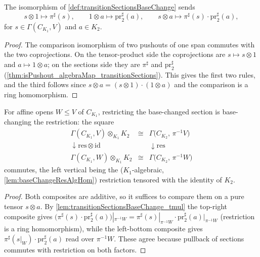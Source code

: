 \begin{lemma}
  \label{lem:transitionSectionsBaseChange_tmul}
  \leanok
  The isomorphism of \ref{def:transitionSectionsBaseChange} sends
  \[
    s \otimes 1 \longmapsto \pi^{\sharp}(s), \qquad
    1 \otimes a \longmapsto \mathrm{pr}_2^{\sharp}(a), \qquad
    s \otimes a \longmapsto \pi^{\sharp}(s) \cdot \mathrm{pr}_2^{\sharp}(a),
  \]
  for \(s \in \Gamma(C_{K_1}, V)\) and \(a \in K_2\).
\end{lemma}
\begin{proof}
  \leanok
  The comparison isomorphism of two pushouts of one span commutes with the two
  coprojections. On the tensor-product side the coprojections are \(s \mapsto s \otimes
  1\) and \(a \mapsto 1 \otimes a\); on the sections side they are \(\pi^{\sharp}\) and
  \(\mathrm{pr}_2^{\sharp}\) (\ref{thm:isPushout_algebraMap_transitionSections}). This
  gives the first two rules, and the third follows since \(s \otimes a = (s \otimes 1)
  \cdot (1 \otimes a)\) and the comparison is a ring homomorphism.
\end{proof}

\begin{lemma}
  \label{lem:transitionSectionsBaseChange_naturality}
  \leanok
  For affine opens \(W \le V\) of \(C_{K_1}\), restricting the base-changed section is
  base-changing the restriction: the square
  \[
    \begin{array}{ccc}
      \Gamma(C_{K_1}, V) \otimes_{K_1} K_2 & \cong &
        \Gamma\bigl(C_{K_2},\, \pi^{-1}V\bigr) \\
      \downarrow \mathrm{res} \otimes \mathrm{id} & & \downarrow \mathrm{res} \\
      \Gamma(C_{K_1}, W) \otimes_{K_1} K_2 & \cong &
        \Gamma\bigl(C_{K_2},\, \pi^{-1}W\bigr)
    \end{array}
  \]
  commutes, the left vertical being the (\(K_1\)-algebraic,
  \ref{lem:baseChangeResAlgHom}) restriction tensored with the identity of \(K_2\).
\end{lemma}
\begin{proof}
  \leanok
  Both composites are additive, so it suffices to compare them on a pure tensor
  \(s \otimes a\). By \ref{lem:transitionSectionsBaseChange_tmul} the top-right composite
  gives \(\bigl(\pi^{\sharp}(s) \cdot \mathrm{pr}_2^{\sharp}(a)\bigr)|_{\pi^{-1}W} =
  \pi^{\sharp}(s)|_{\pi^{-1}W} \cdot \mathrm{pr}_2^{\sharp}(a)|_{\pi^{-1}W}\)
  (restriction is a ring homomorphism), while the left-bottom composite gives
  \(\pi^{\sharp}(s|_W) \cdot \mathrm{pr}_2^{\sharp}(a)\) read over \(\pi^{-1}W\). These
  agree because pullback of sections commutes with restriction on both factors.
\end{proof}

